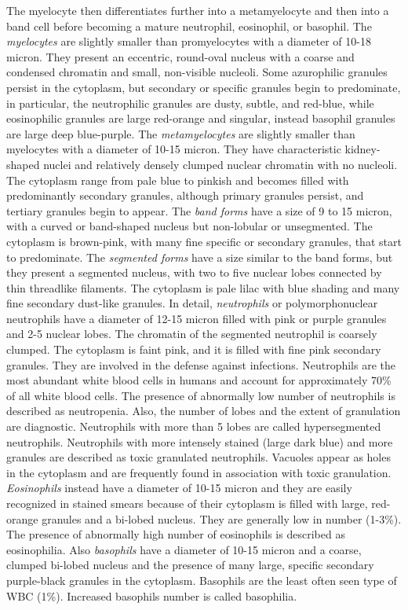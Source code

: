 The myelocyte then differentiates further into a metamyelocyte and then into a band cell before becoming a mature neutrophil, eosinophil, or basophil. The \textit{myelocytes} are slightly smaller than promyelocytes with a diameter of 10-18 micron. They present an eccentric, round-oval nucleus with a coarse and condensed chromatin and small, non-visible nucleoli. Some azurophilic granules persist in the cytoplasm, but secondary or specific granules begin to predominate, in particular, the neutrophilic granules are dusty, subtle, and red-blue, while eosinophilic granules are large red-orange and singular, instead basophil granules are large deep blue-purple. The \textit{metamyelocytes} are slightly smaller than myelocytes with a diameter of  10-15 micron. They have characteristic kidney-shaped nuclei and relatively densely clumped nuclear chromatin with no nucleoli. The cytoplasm range from pale blue to pinkish and becomes filled with predominantly secondary granules, although primary granules persist, and tertiary granules begin to appear. The \textit{band forms} have a size of 9 to 15 micron, with a curved or band-shaped nucleus but non-lobular or unsegmented. The cytoplasm is brown-pink, with many fine specific or secondary granules, that start to predominate. The \textit{segmented forms} have a size similar to the band forms, but they present a segmented nucleus, with two to five nuclear lobes connected by thin threadlike filaments. The cytoplasm is pale lilac with blue shading and many fine secondary dust-like granules. In detail, \textit{neutrophils} or polymorphonuclear neutrophils have a diameter of 12-15 micron filled with pink or purple granules and 2-5 nuclear lobes. The chromatin of the segmented neutrophil is coarsely clumped. The cytoplasm is faint pink, and it is filled with fine pink secondary granules. They are involved in the defense against infections. Neutrophils are the most abundant white blood cells in humans and account for approximately 70\% of all white blood cells. The presence of abnormally low number of neutrophils is described as neutropenia. Also, the number of lobes and the extent of granulation are diagnostic. Neutrophils with more than 5 lobes are called hypersegmented neutrophils. Neutrophils with more intensely stained (large dark blue) and more granules are described as toxic granulated neutrophils. Vacuoles appear as holes in the cytoplasm and are frequently found in association with toxic granulation. \textit{Eosinophils} instead have a diameter of 10-15 micron and they are easily recognized in stained smears because of their cytoplasm is filled with large, red-orange granules and a bi-lobed nucleus. They are generally low in number (1-3\%). The presence of abnormally high number of eosinophils is described as eosinophilia. Also \textit{basophils} have a diameter of 10-15 micron and a coarse, clumped bi-lobed nucleus and the presence of many large, specific secondary purple-black granules in the cytoplasm. Basophils are the least often seen type of WBC (1\%). Increased basophils number is called basophilia.

